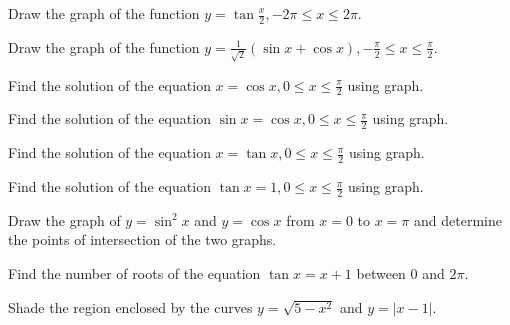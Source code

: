 \item Draw the graph of the function $y = \tan\frac{x}{2}, -2\pi\leq x\leq 2\pi$.

\item Draw the graph of the function $y = \frac{1}{\sqrt{2}}(\sin x + \cos x), -\frac{\pi}{2}\leq
    x\leq\frac{\pi}{2}$.

\item Find the solution of the equation $x = \cos x, 0\leq x\leq\frac{\pi}{2}$ using graph.

\item Find the solution of the equation $\sin x = \cos x, 0\leq x\leq\frac{\pi}{2}$ using graph.

\item Find the solution of the equation $x = \tan x, 0\leq x\leq\frac{\pi}{2}$ using graph.

\item Find the solution of the equation $\tan x = 1, 0\leq x\leq \frac{\pi}{2}$ using graph.

\item Draw the graph of $y = \sin^2x$ and $y = \cos x$ from $x = 0$ to $x = \pi$ and
    determine the points of intersection of the two graphs.

\item Find the number of roots of the equation $\tan x = x + 1$ between $0$ and $2\pi$.

\item Shade the region enclosed by the curves $y = \sqrt{5 - x^2}$ and $y = |x - 1|$.
\stopitemize
